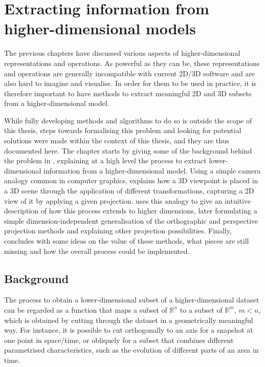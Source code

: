 
\chapter{Extracting information from higher-dimensional models}
\label{ch:slicing}

The previous chapters have discussed various aspects of higher-dimensional representations and operations.
As powerful as they can be, these representations and operations are generally incompatible with current 2D/3D software and are also hard to imagine and visualise.
In order for them to be used in practice, it is therefore important to have methods to extract meaningful 2D and 3D subsets from a higher-dimensional model.

While fully developing methods and algorithms to do so is outside the scope of this thesis, steps towards formalising this problem and looking for potential solutions were made within the context of this thesis, and they are thus documented here.
The chapter starts by giving some of the background behind the problem in , explaining at a high level the process to extract lower-dimensional information from a higher-dimensional model.
Using a simple camera analogy common in computer graphics,  explains how a 3D viewpoint is placed in a 3D scene through the application of different transformations, capturing a 2D view of it by applying a given projection.
 uses this analogy to give an intuitive description of how this process extends to higher dimensions, later formulating a simple dimension-independent generalisation of the orthographic and perspective projection methods and explaining other projection possibilities.
Finally,  concludes with some ideas on the value of these methods, what pieces are still missing and how the overall process could be implemented.

\section{Background}
\label{se:slicing-notions}

The process to obtain a lower-dimensional subset of a higher-dimensional dataset can be regarded as a function that maps a subset of $\mathbb{R}^n$ to a subset of $\mathbb{R}^m$, $m < n$, which is obtained by cutting through the dataset in a geometrically meaningful way.
For instance, it is possible to cut orthogonally to an axis for a snapshot at one point in space/time, or obliquely for a subset that combines different parametrised characteristics, such as the evolution of different parts of an area in time.

